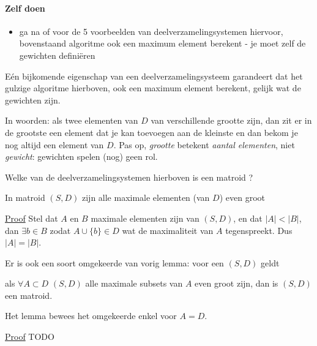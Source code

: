 \paragraph{Zelf doen}

\begin{itemize}
\item[] ga na of voor de 5 voorbeelden van deelverzamelingsystemen
hiervoor, bovenstaand algoritme ook een maximum element berekent - je
moet zelf de gewichten defini\"eren
\end{itemize}

\newpage

E\'{e}n bijkomende eigenschap van
een deelverzamelingsysteem garandeert dat het gulzige algoritme
hierboven, ook een maximum element berekent, gelijk wat de gewichten
zijn.



In woorden: als twee elementen van $D$ van verschillende grootte zijn,
dan zit er in de grootste een element dat je kan toevoegen aan de
kleinste en dan bekom je nog altijd een element van $D$. Pas op, {\em
grootte} betekent {\em aantal elementen}, niet {\em gewicht}: gewichten spelen (nog) geen rol.


Welke van de deelverzamelingsystemen hierboven is een matroid ?

\begin{lemma}
In matroid $(S,D)$ zijn alle maximale elementen (van $D$) even groot
\end{lemma}
\underline{Proof}
Stel dat $A$ en $B$ maximale elementen zijn van $(S,D)$, en dat $|A| <
|B|$, dan $\exists b \in B$ zodat $A \cup \{b\} \in D$ wat de
maximaliteit van $A$ tegenspreekt. Dus $|A| = |B|$.
\prend

Er is ook een soort omgekeerde van vorig lemma: voor een $(S,D)$ geldt

als $\forall A \subset D$ $(S,D)$ alle maximale subsets van $A$ even
groot zijn, dan is $(S,D)$ een matroid.

Het lemma bewees het omgekeerde enkel voor $A = D$.


\underline{Proof}
TODO
\prend

